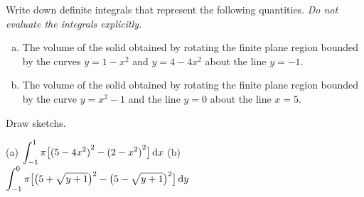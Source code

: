\begin{Mquestion}[2001A,M121 2001A]  %
Write down definite integrals that represent the following quantities.
\emph{Do not evaluate the integrals explicitly.}
\begin{enumerate}[(a)]
\item
The volume of the solid obtained by rotating the finite plane
region bounded by the curves $y=1-x^2$ and $y=4-4x^2$ about the line $y=-1$.
\item
The volume of the solid obtained by rotating the finite plane
region bounded by the curve $y=x^2-1$ and the line $y=0$ about the line $x=5$.
\end{enumerate}
\end{Mquestion}

\begin{hint}
Draw sketchs.
\end{hint}

\begin{answer} (a)
$\displaystyle\int_{-1}^{1}\pi\big[{(5-4x^2)}^2-{(2-x^2)}^2\big]\,\mathrm{d}x$
\qquad (b)
$\displaystyle\int _{-1}^0   \pi\big[\big(5+\sqrt{y+1}\big)^2-\big(5-\sqrt{y+1}\big)^2\big]\,\mathrm{d}y$

\end{answer}

